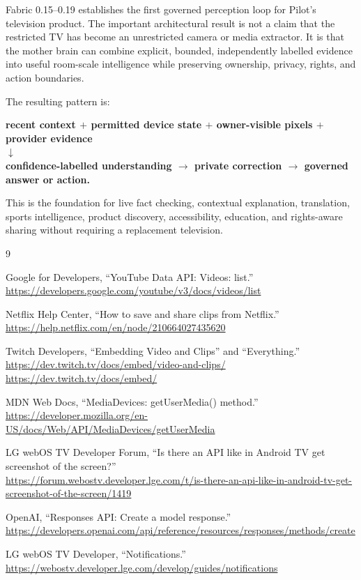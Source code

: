 \documentclass[11pt,a4paper]{article}
\begin{document}
Fabric 0.15--0.19 establishes the first governed perception loop for Pilot's
television product.  The important architectural result is not a claim that the
restricted TV has become an unrestricted camera or media extractor.  It is
that the mother brain can combine explicit, bounded, independently labelled
evidence into useful room-scale intelligence while preserving ownership,
privacy, rights, and action boundaries.

The resulting pattern is:

\begin{center}
\textbf{recent context $+$ permitted device state $+$ owner-visible pixels
$+$ provider evidence}\\[4pt]
$\downarrow$\\[4pt]
\textbf{confidence-labelled understanding $\rightarrow$ private correction
$\rightarrow$ governed answer or action.}
\end{center}

This is the foundation for live fact checking, contextual explanation,
translation, sports intelligence, product discovery, accessibility, education,
and rights-aware sharing without requiring a replacement television.

\begin{thebibliography}{9}

Google for Developers, ``YouTube Data API: Videos: list.''\\
\url{https://developers.google.com/youtube/v3/docs/videos/list}

Netflix Help Center, ``How to save and share clips from Netflix.''\\
\url{https://help.netflix.com/en/node/210664027435620}

Twitch Developers, ``Embedding Video and Clips'' and ``Everything.''\\
\url{https://dev.twitch.tv/docs/embed/video-and-clips/}\\
\url{https://dev.twitch.tv/docs/embed/}

MDN Web Docs, ``MediaDevices: getUserMedia() method.''\\
\url{https://developer.mozilla.org/en-US/docs/Web/API/MediaDevices/getUserMedia}

LG webOS TV Developer Forum, ``Is there an API like in Android TV get
screenshot of the screen?''\\
\url{https://forum.webostv.developer.lge.com/t/is-there-an-api-like-in-android-tv-get-screenshot-of-the-screen/1419}

OpenAI, ``Responses API: Create a model response.''\\
\url{https://developers.openai.com/api/reference/resources/responses/methods/create}

LG webOS TV Developer, ``Notifications.''\\
\url{https://webostv.developer.lge.com/develop/guides/notifications}

\end{thebibliography}
\end{document}
